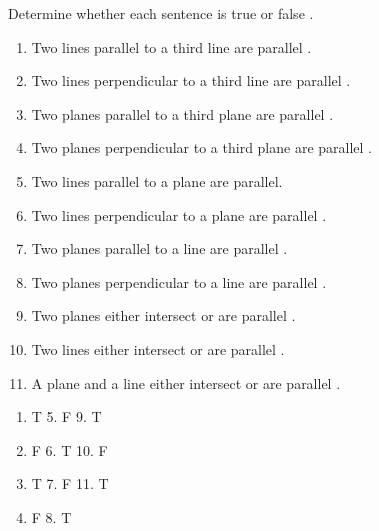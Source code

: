 \begin{example}
Determine whether each sentence is true or false .
\begin{enumerate}
    \item Two lines parallel to a third line are parallel .
    \item Two lines perpendicular to a third line are parallel .
    \item Two planes parallel to a third plane are parallel .
    \item Two planes perpendicular to a third plane are parallel .
    \item Two lines parallel to a plane are parallel.
    \item Two lines perpendicular to a plane are parallel .
    \item Two planes parallel to a line are parallel .
       \item Two planes perpendicular to a line are parallel .
       \item Two planes either intersect or are parallel .
       \item Two lines either intersect or are parallel .
       \item A plane and a line either intersect or are parallel .
    
\end{enumerate}
{}
\begin{enumerate}
\item T \hspace{2cm} 5. F \hspace{2cm} 9. T
\item F \hspace{2cm} 6. T \hspace{2cm} 10. F
\item T \hspace{2cm} 7. F \hspace{2cm} 11. T
\item F \hspace{2cm} 8. T  
\end{enumerate}
\end{example}
\noindent{\color{smalt(darkpowderblue)}\rule{\linewidth}{.2mm}}